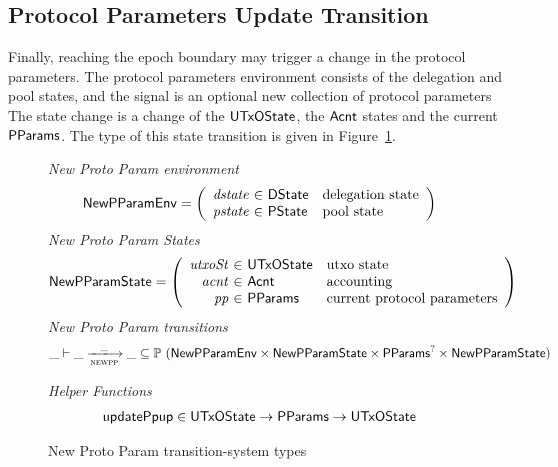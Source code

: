 \clearpage

\subsection{Protocol Parameters Update Transition}
\label{sec:pparam-update}

Finally, reaching the epoch boundary may trigger a change in the protocol parameters.
The protocol parameters environment consists of the delegation and pool states,
and the signal is an optional new collection of protocol parameters
The state change is a change of the $\mathsf{UTxOState}$, the $\mathsf{Acnt}$ states and the current $\mathsf{PParams}$.
The type of this state transition is given in Figure~\ref{fig:ts-types:new-proto-param}.

\begin{figure}[htb]
  \emph{New Proto Param environment}
  \begin{equation*}
    \NewPParamEnv =
    \left(
      \begin{array}{r@{~\in~}ll}
        \var{dstate} & \DState & \text{delegation state}\\
        \var{pstate} & \PState & \text{pool state}\\
      \end{array}
    \right)
  \end{equation*}
  \emph{New Proto Param States}
  \begin{equation*}
    \NewPParamState =
    \left(
      \begin{array}{r@{~\in~}ll}
        \var{utxoSt} & \UTxOState & \text{utxo state}\\
        \var{acnt} & \Acnt & \text{accounting}\\
        \var{pp} & \PParams & \text{current protocol parameters}\\
      \end{array}
    \right)
  \end{equation*}
  \emph{New Proto Param transitions}
  \begin{equation*}
    \_ \vdash
    \var{\_} \trans{newpp}{\_} \var{\_}
    \subseteq \powerset (\NewPParamEnv \times \NewPParamState \times \PParams^? \times \NewPParamState)
  \end{equation*}
  \caption{New Proto Param transition-system types}
  \label{fig:ts-types:new-proto-param}
  \emph{Helper Functions}
  \begin{align*}
      & \fun{updatePpup} \in \UTxOState \to \PParams \to \UTxOState\\

\end{align*}
\end{figure}
